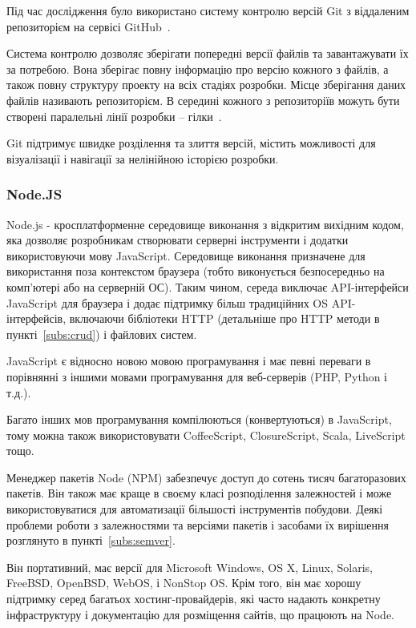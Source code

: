 Під час дослідження було використано систему контролю версій Git з віддаленим репозиторієм на сервісі GitHub~\cite{gCalShedule}.

Система контролю дозволяє зберігати попередні версії файлів та завантажувати їх за потребою. Вона зберігає повну інформацію про версію кожного з файлів, а також повну структуру проекту на всіх стадіях розробки. Місце зберігання даних файлів називають репозиторієм. В середині кожного з репозиторіїв можуть бути створені паралельні лінії розробки -- гілки~\cite{loeliger2012version}.

Git підтримує швидке розділення та злиття версій, містить можливості для візуалізації і навігації за нелінійною історією розробки. 


\subsubsection{Node.JS}

Node.js - кросплатформенне середовище виконання з відкритим вихідним кодом, яка дозволяє розробникам створювати серверні інструменти і додатки використовуючи мову JavaScript. Середовище виконання призначене для використання поза контекстом браузера (тобто виконується безпосередньо на комп'ютері або на серверній ОС). Таким чином, середа виключає API-інтерфейси JavaScript для браузера і додає підтримку більш традиційних OS API-інтерфейсів, включаючи бібліотеки HTTP (детальніше про HTTP методи в пункті~\ref{subs:crud}) і файлових систем.

JavaScript є відносно новою мовою програмування і має певні переваги в порівнянні з іншими мовами програмування для веб-серверів (PHP, Python і т.д.).

Багато інших мов програмування компілюються (конвертуються) в JavaScript, тому можна також використовувати CoffeeScript, ClosureScript, Scala, LiveScript тощо.

Менеджер пакетів Node (NPM) забезпечує доступ до сотень тисяч багаторазових пакетів. Він також має краще в своєму класі розподілення залежностей і може використовуватися для автоматизації більшості інструментів побудови. Деякі проблеми роботи з залежностями та версіями пакетів і засобами їх вирішення розглянуто в пункті~\ref{subs:semver}. 

Він портативний, має версії для Microsoft Windows, OS X, Linux, Solaris, FreeBSD, OpenBSD, WebOS, і NonStop OS. Крім того, він має хорошу підтримку серед багатьох хостинг-провайдерів, які часто надають конкретну інфраструктуру і документацію для розміщення сайтів, що працюють на Node.

